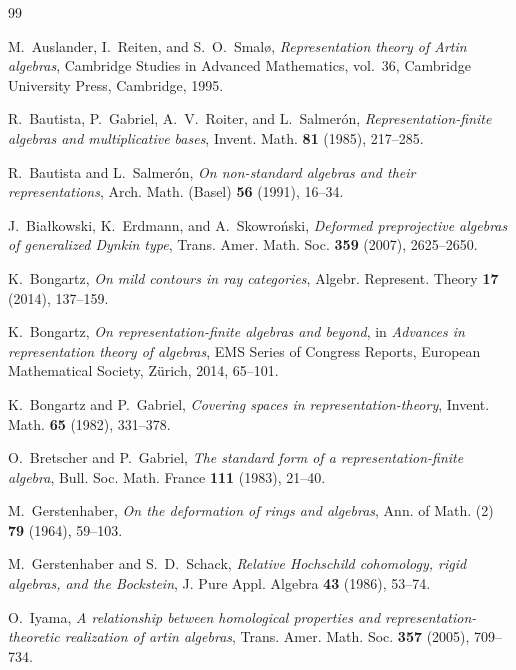 \documentclass[a4paper,reqno,11pt]{amsart}
\theoremstyle{definition}
\begin{document}
\clearpage
\appendix

\clearpage

\clearpage


\begin{thebibliography}{99}

M.~Auslander, I.~Reiten, and S.~O.~Smal\o,
\emph{Representation theory of Artin algebras},
Cambridge Studies in Advanced Mathematics, vol.~36,
Cambridge University Press, Cambridge, 1995.

R.~Bautista, P.~Gabriel, A.~V.~Roiter, and L.~Salmer\'on,
\emph{Representation-finite algebras and multiplicative bases},
Invent. Math. \textbf{81} (1985), 217--285.

R.~Bautista and L.~Salmer\'on,
\emph{On non-standard algebras and their representations},
Arch. Math. (Basel) \textbf{56} (1991), 16--34.

J.~Bia\l kowski, K.~Erdmann, and A.~Skowro\'nski,
\emph{Deformed preprojective algebras of generalized Dynkin type},
Trans. Amer. Math. Soc. \textbf{359} (2007), 2625--2650.

K.~Bongartz,
\emph{On mild contours in ray categories},
Algebr. Represent. Theory \textbf{17} (2014), 137--159.

K.~Bongartz,
\emph{On representation-finite algebras and beyond},
in \emph{Advances in representation theory of algebras},
EMS Series of Congress Reports, European Mathematical Society, Z\"urich,
2014, 65--101.

K.~Bongartz and P.~Gabriel,
\emph{Covering spaces in representation-theory},
Invent. Math. \textbf{65} (1982), 331--378.

O.~Bretscher and P.~Gabriel,
\emph{The standard form of a representation-finite algebra},
Bull. Soc. Math. France \textbf{111} (1983), 21--40.

M.~Gerstenhaber,
\emph{On the deformation of rings and algebras},
Ann. of Math. (2) \textbf{79} (1964), 59--103.

M.~Gerstenhaber and S.~D.~Schack,
\emph{Relative Hochschild cohomology, rigid algebras, and the Bockstein},
J. Pure Appl. Algebra \textbf{43} (1986), 53--74.

O.~Iyama,
\emph{A relationship between homological properties and
representation-theoretic realization of artin algebras},
Trans. Amer. Math. Soc. \textbf{357} (2005), 709--734.


\end{thebibliography}
\end{document}
